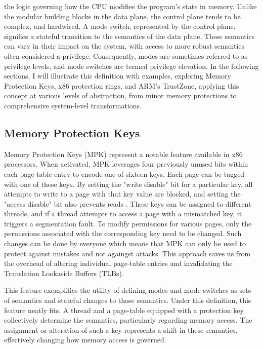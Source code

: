 the logic governing how the CPU modifies the program's state in memory. Unlike the
modular building blocks in the data plane, the control plane tends to be
complex, and hardwired. A mode switch, represented by the control plane,
signifies a stateful transition to the semantics of the data plane. These
semantics can vary in their impact on the system, with access to more robust
semantics often considered a privilege. Consequently, modes are sometimes
referred to as privilege levels, and mode switches are termed privilege
elevation. In the following sections, I will illustrate this definition with
examples, exploring Memory Protection Keys, x86 protection rings, and ARM's TrustZone,
applying this concept at various levels of abstraction, from minor memory
protections to comprehensive system-level transformations.\par

\subsection{Memory Protection Keys}
Memory Protection Keys (MPK) represent a notable feature available in x86
processors. When activated, MPK leverages four previously unused bits within
each page-table entry to encode one of sixteen keys. Each page can be tagged
with one of these keys. By setting the "write disable" bit for a particular key,
all attempts to write to a page with that key value are blocked, and setting the
"access disable" bit also prevents reads \cite{Corbet}. These keys can be assigned to
different threads, and if a thread attempts to access a page with a mismatched
key, it triggers a segmentation fault. To modify permissions for various pages,
only the permissions associated with the corresponding key need to be changed.
Such changes can be done by everyone which means that MPK can only be used to
protect against mistakes and not againgst attacks. This approach saves us from
the overhead of altering individual page-table entries and invalidating the
Translation Lookaside Buffers (TLBs).\par
This feature exemplifies the utility of defining modes and mode switches as sets
of semantics and stateful changes to those semantics. Under this definition,
this feature neatly fits. A thread and a page-table equipped with a protection
key collectively determine the semantics, particularly regarding memory access.
The assignment or alteration of such a key represents a shift in these
semantics, effectively changing how memory access is governed. 

